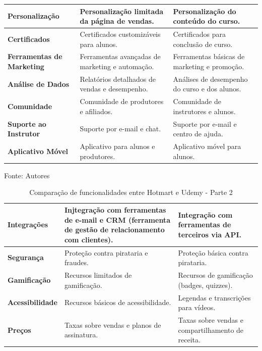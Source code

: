\begin{apendicesenv}
\begin{table}[h]
\begin{adjustbox}{width=\textwidth}
\begin{tabular}{|p{5cm}|p{5cm}|p{5cm}|}
        \hline
        \textbf{Personalização} & Personalização limitada da página de vendas. & Personalização do conteúdo do curso. \\
        \hline
        \textbf{Certificados} & Certificados customizáveis para alunos. & Certificados para conclusão de curso. \\
        \hline
        \textbf{Ferramentas de Marketing} & Ferramentas avançadas de marketing e automação. & Ferramentas básicas de marketing e promoção. \\
        \hline
        \textbf{Análise de Dados} & Relatórios detalhados de vendas e desempenho. & Análises de desempenho do curso e dos alunos. \\
        \hline
        \textbf{Comunidade} & Comunidade de produtores e afiliados. & Comunidade de instrutores e alunos. \\
        \hline
        \textbf{Suporte ao Instrutor} & Suporte por e-mail e chat. & Suporte por e-mail e centro de ajuda. \\
        \hline
        \textbf{Aplicativo Móvel} & Aplicativo para alunos e produtores. & Aplicativo móvel para alunos. \\
        \hline
    \end{tabular}
    \end{adjustbox}

    \vspace{5mm}
    {\footnotesize Fonte: Autores} 

\end{table}

\begin{table}[h]
    \centering
    \caption{Comparação de funcionalidades entre Hotmart e Udemy - Parte 2}
    \label{tab:comparacao_hotmart_udemy2}
    \begin{adjustbox}{width=\textwidth}
    \begin{tabular}{|p{5cm}|p{5cm}|p{5cm}|}
\hline
\textbf{Integrações} & Injtegração com ferramentas de e-mail e CRM (ferramenta de gestão de relacionamento com clientes). & Integração com ferramentas de terceiros via API. \\
\hline
\textbf{Segurança} & Proteção contra pirataria e fraudes. & Proteção básica contra pirataria. \\
\hline
\textbf{Gamificação} & Recursos limitados de gamificação. & Recursos de gamificação (badges, quizzes). \\
\hline
\textbf{Acessibilidade} & Recursos básicos de acessibilidade. & Legendas e transcrições para vídeos. \\
\hline
\textbf{Preços} & Taxas sobre vendas e planos de assinatura. & Taxas sobre vendas e compartilhamento de receita. \\
\hline
\end{tabular}
\end{adjustbox}


\end{table}
\end{apendicesenv}
